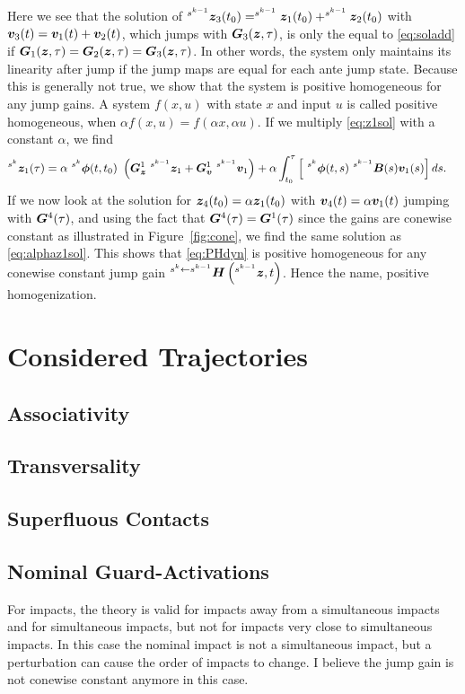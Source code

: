 \documentclass[../DC2017114Bouma.tex]{subfiles}
\begin{document}
Here we see that the solution of $^{s^{k-1}}{\boldsymbol{z}}_3(t_0) = ^{s^{k-1}}{\boldsymbol{z}}_1(t_0) + ^{s^{k-1}}{\boldsymbol{z}}_2(t_0)$ with ${\boldsymbol{v}}_3(t) = {\boldsymbol{v}}_1(t) + {\boldsymbol{v}}_2(t)$, which jumps with ${\boldsymbol{G}}_3({\boldsymbol{z}},\tau)$, is only the equal to \eqref{eq:soladd} if ${\boldsymbol{G}}_1({\boldsymbol{z}},\tau) = {\boldsymbol{G}}_2({\boldsymbol{z}},\tau) = {\boldsymbol{G}}_3({\boldsymbol{z}},\tau)$. In other words, the system only maintains its linearity after jump if the jump maps are equal for each ante jump state. Because this is generally not true, we show that the system is positive homogeneous for any jump gains. A system $f(x,u)$ with state $x$ and input $u$ is called positive homogeneous, when $\alpha f(x,u) = f(\alpha x, \alpha u)$. If we multiply \eqref{eq:z1sol} with a constant $\alpha$, we find
\begin{align}
^{s^{k}}\zb_1(\tau) &= \alpha \ ^{s^{k}}\phib(t,t_0)\ \left(\Gb_\zb^1 \ ^{s^{k-1}}\zb_1 + \Gb_\vb^1\ ^{s^{k-1}}\vb_1\right) + \alpha\int_{t_0}^\tau \left[\ ^{s^{k}}\phib(t,s)\ ^{s^{k-1}}\Bb(s)\vb_1(s)\right]ds.\label{eq:alphaz1sol}
\end{align}
If we now look at the solution for ${\boldsymbol{z}}_4(t_0) = \alpha{\boldsymbol{z}}_1(t_0)$ with ${\boldsymbol{v}}_4(t) = \alpha{\boldsymbol{v}}_1(t)$ jumping with ${\boldsymbol{G}}^4(\tau)$, and using the fact that ${\boldsymbol{G}}^4(\tau) = {\boldsymbol{G}}^1(\tau)$ since the gains are conewise constant as illustrated in Figure~\ref{fig:cone}, we find the same solution as \eqref{eq:alphaz1sol}. This shows that \eqref{eq:PHdyn} is positive homogeneous for any conewise constant jump gain $^{s^{k}\leftarrow s^{k-1}}{\boldsymbol{H}}\left(^{s^{k-1}}{\boldsymbol{z}},t\right)$. Hence the name, positive homogenization. 

\cleartooddpage
\chapter{Considered Trajectories}\label{app:trajectories}
\section{Associativity}
\section{Transversality}
\section{Superfluous Contacts}
\section{Nominal Guard-Activations}
For impacts, the theory is valid for impacts away from a simultaneous impacts and for simultaneous impacts, but not for impacts very close to simultaneous impacts. In this case the nominal impact is not a simultaneous impact, but a perturbation can cause the order of impacts to change. I believe the jump gain is not conewise constant anymore in this case.
\end{document}
